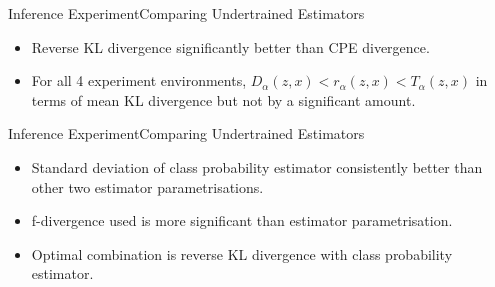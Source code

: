 \documentclass{beamer}
\begin{document}
\begin{frame}{Inference Experiment}{Comparing Undertrained Estimators}
\begin{table}[h]
\end{table}
\begin{itemize}
\item Reverse KL divergence significantly better than CPE divergence.
\item For all 4 experiment environments, $D_\alpha(z,x)<r_\alpha(z,x)<T_\alpha(z,x)$ in terms of mean KL divergence but not by a significant amount.
\end{itemize}
\end{frame}
\begin{frame}{Inference Experiment}{Comparing Undertrained Estimators}
\begin{itemize}
\item Standard deviation of class probability estimator consistently better than other two estimator parametrisations.
\item f-divergence used is more significant than estimator parametrisation.
\item Optimal combination is reverse KL divergence with class probability estimator.
\end{itemize}
\end{frame}
\end{document}
